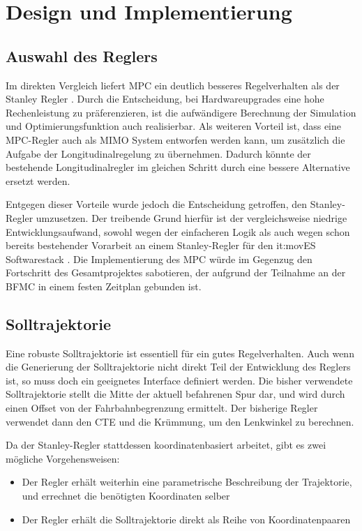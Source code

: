 \section{Design und Implementierung}
\subsection{Auswahl des Reglers}
Im direkten Vergleich liefert \gls{MPC} ein deutlich besseres Regelverhalten als der Stanley Regler \cite{stanley_mpc_comparison1}\cite{stanley_mpc_comparison2}. 
Durch die Entscheidung, bei Hardwareupgrades eine hohe Rechenleistung zu präferenzieren, ist die aufwändigere Berechnung der Simulation und Optimierungsfunktion auch realisierbar.
Als weiteren Vorteil ist, dass eine \gls{MPC}-Regler auch als \gls{MIMO} System entworfen werden kann, um zusätzlich die Aufgabe der Longitudinalregelung zu übernehmen.
Dadurch könnte der bestehende Longitudinalregler im gleichen Schritt durch eine bessere Alternative ersetzt werden.

Entgegen dieser Vorteile wurde jedoch die Entscheidung getroffen, den Stanley-Regler umzusetzen. 
Der treibende Grund hierfür ist der vergleichsweise niedrige Entwicklungsaufwand, sowohl wegen der einfacheren Logik als auch wegen schon bereits bestehender Vorarbeit an einem Stanley-Regler für den it:movES Softwarestack \cite{Nico_Stanley}.
Die Implementierung des \gls{MPC} würde im Gegenzug den Fortschritt des Gesamtprojektes sabotieren, der aufgrund der Teilnahme an der \gls{BFMC} in einem festen Zeitplan gebunden ist.

\subsection{Solltrajektorie}
Eine robuste Solltrajektorie ist essentiell für ein gutes Regelverhalten.
Auch wenn die Generierung der Solltrajektorie nicht direkt Teil der Entwicklung des Reglers ist, so muss doch ein geeignetes Interface definiert werden.
Die bisher verwendete Solltrajektorie stellt die Mitte der aktuell befahrenen Spur dar, und wird durch einen Offset von der Fahrbahnbegrenzung ermittelt.
Der bisherige Regler verwendet dann den \gls{CTE} und die Krümmung, um den Lenkwinkel zu berechnen.

Da der Stanley-Regler stattdessen koordinatenbasiert arbeitet, gibt es zwei mögliche Vorgehensweisen:
\begin{itemize}
    \item Der Regler erhält weiterhin eine parametrische Beschreibung der Trajektorie, und errechnet die benötigten Koordinaten selber
    \item Der Regler erhält die Solltrajektorie direkt als Reihe von Koordinatenpaaren
\end{itemize}

